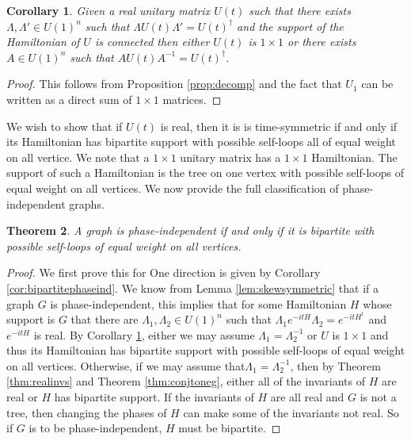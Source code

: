 \documentclass[twocolumn,superscriptaddress]{revtex4-1}
\theoremstyle{plain}
\newtheorem{theorem}{Theorem}[section]
\newtheorem{corollary}[theorem]{Corollary}
\theoremstyle{definition}
\theoremstyle{definition}
\theoremstyle{definition}
\theoremstyle{definition}
\theoremstyle{definition}
\theoremstyle{definition}
\begin{document}
 

\begin{corollary}\label{cor:twocases}
 Given a real unitary matrix $U(t)$ such that there exists $\Lambda,\Lambda'\in U(1)^n$ such that $\Lambda U(t)\Lambda'=U(t)^\dagger$ and the support of the Hamiltonian of $U$ is connected then either $U(t)$ is $1\times 1$ or there exists $A\in U(1)^n$ such that $A U(t)A^{-1}=U(t)^\dagger$.
\end{corollary}
\begin{proof}
 This follows from Proposition \ref{prop:decomp} and the fact that $U_1$ can be written as a direct sum of $1\times 1$ matrices. 
\end{proof}

We wish to show that if $U(t)$ is real, then it is is time-symmetric if and only if its Hamiltonian has bipartite support with possible self-loops all of equal weight on all vertice. We note that a $1\times 1$ unitary matrix has a $1\times 1$ Hamiltonian. The support of such a Hamiltonian is the tree on one vertex with possible self-loops of equal weight on all vertices. We now provide the full classification of phase-independent graphs.

\begin{theorem}\label{thm:classify}
 A graph is phase-independent if and only if it is bipartite with possible self-loops of equal weight on all vertices.
\end{theorem}
\begin{proof}
We first prove this for One direction is given by Corollary \ref{cor:bipartitephaseind}.  We know from Lemma \ref{lem:skewsymmetric} that if a graph $G$ is phase-independent, this implies that for some Hamiltonian $H$ whose support is $G$ that there are $\Lambda_1,\Lambda_2\in U(1)^n$ such that $\Lambda_1 e^{-itH}\Lambda_2=e^{-itH^\dagger}$ and $e^{-itH}$ is real. By Corollary \ref{cor:twocases}, either we may assume $\Lambda_1=\Lambda_2^{-1}$ or $U$ is $1\times 1$ and thus its Hamiltonian has bipartite support with possible self-loops of equal weight on all vertices. Otherwise, if we may assume that$\Lambda_1=\Lambda_2^{-1}$, then by Theorem \ref{thm:realinvs} and Theorem \ref{thm:conjtoneg}, either all of the invariants of $H$ are real or $H$ has bipartite support. If the invariants of $H$ are all real and $G$ is not a tree, then changing the phases of $H$ can make some of the invariants not real. So if $G$ is to be phase-independent, $H$ must be bipartite. 
\end{proof}
\end{document}
